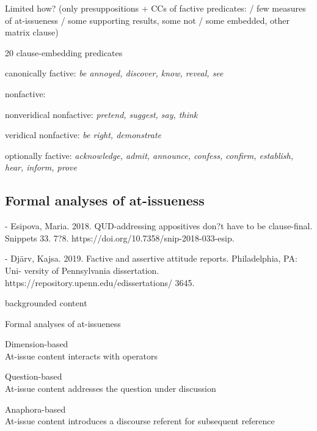 \documentclass[11pt,fleqn]{article}
\newcommand{\6}{\mbox{$[\hspace*{-.6mm}[$}}
\newcommand{\9}{\mbox{$]\hspace*{-.6mm}]$}}
\begin{document}
Limited how? (only presuppositions + CCs of factive predicates: \citealt{degen-tonhauser-factive} / few measures of at-issueness / some supporting results, some not / some embedded, other matrix clause)

\begin{exe}
\ex\label{pred} 20 clause-embedding predicates 

\begin{xlist}

\ex canonically factive: {\em be annoyed, discover, know, reveal, see}

\ex nonfactive:

\begin{xlist}

\ex nonveridical nonfactive: {\em pretend, suggest, say, think}

\ex veridical nonfactive: {\em be right, demonstrate}

\end{xlist}

\ex optionally factive: {\em acknowledge, admit, announce, confess, confirm, establish, hear, inform, prove}

\end{xlist}

\end{exe}


\subsection{Formal analyses of at-issueness}

- Esipova, Maria. 2018. QUD-addressing appositives don?t have to be clause-final. Snippets 33. 7?8. https://doi.org/10.7358/snip-2018-033-esip. 

- Dj\"arv, Kajsa. 2019. Factive and assertive attitude reports. Philadelphia, PA: Uni- versity of Pennsylvania dissertation. https://repository.upenn.edu/edissertations/ 3645. 

backgrounded content

\begin{exe}
\ex Formal analyses of at-issueness

\begin{xlist}
\ex Dimension-based \\ At-issue content interacts with operators

\ex Question-based \\ At-issue content addresses the question under discussion

\ex Anaphora-based \\ At-issue content introduces a discourse referent for subsequent reference

\end{xlist}
\end{exe}
\end{document}
